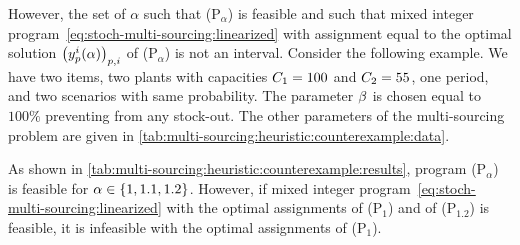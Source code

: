 However, the set of $\alpha$ such that (P$_{\alpha}$) is feasible and such that mixed integer program~\eqref{eq:stoch-multi-sourcing:linearized} with assignment equal to the optimal solution $\bracket{\open_p^i(\alpha)}_{p,i}$ of (P$_{\alpha}$) is not an interval.
Consider the following example.
We have two items, two plants with capacities $C_1=100$ and $C_2=55$, one period, and two scenarios with same probability.
The parameter $\beta$ is chosen equal to $100\%$ preventing from any stock-out.
The other parameters of the multi-sourcing problem are given in \cref{tab:multi-sourcing:heuristic:counterexample:data}.
\begin{table}[h]
\hfill
{}
\hfill
{}
\caption{Parameters of the counterexample}
\label{tab:multi-sourcing:heuristic:counterexample:data}
\end{table}

As shown in \cref{tab:multi-sourcing:heuristic:counterexample:results}, program (P$_{\alpha}$) is feasible for $\alpha\in\crbracket{1,1.1,1.2}$. However, if mixed integer program~\eqref{eq:stoch-multi-sourcing:linearized} with the optimal assignments of (P$_{1}$) and of (P$_{1.2}$) is feasible, it is infeasible with the optimal assignments of (P$_{1}$).

